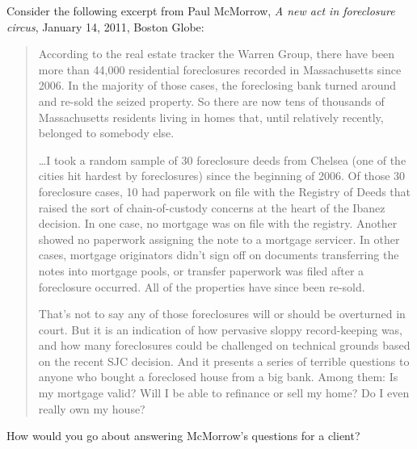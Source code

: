 \item Consider the following excerpt from Paul McMorrow, \textit{A new act in
foreclosure circus}, January 14, 2011, Boston Globe:
\begin{quotation}
According to the real estate tracker the Warren Group, there have been more than
44,000 residential foreclosures recorded in Massachusetts since 2006. In the
majority of those cases, the foreclosing bank turned around and re-sold the
seized property. So there are now tens of thousands of Massachusetts residents
living in homes that, until relatively recently, belonged to somebody else.

\dots I took a random sample of 30 foreclosure deeds from Chelsea (one of the
cities hit hardest by foreclosures) since the beginning of 2006. Of those 30
foreclosure cases, 10 had paperwork on file with the Registry of Deeds that
raised the sort of chain-of-custody concerns at the heart of the Ibanez
decision. In one case, no mortgage was on file with the registry. Another
showed no paperwork assigning the note to a mortgage servicer. In other cases,
mortgage originators didn't sign off on documents transferring the notes into
mortgage pools, or transfer paperwork was filed after a foreclosure occurred.
All of the properties have since been re-sold.

That's not to say any of those foreclosures will or should be overturned in
court. But it is an indication of how pervasive sloppy record-keeping was, and
how many foreclosures could be challenged on technical grounds based on the
recent SJC decision. And it presents a series of terrible questions to anyone
who bought a foreclosed house from a big bank. Among them: Is my mortgage
valid? Will I be able to refinance or sell my home? Do I even really own my
house?
\end{quotation}
How would you go about answering McMorrow's questions for a client?


